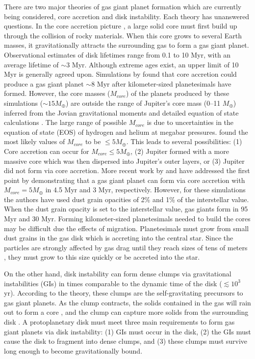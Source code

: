 \documentclass[12pt,preprint2]{aastex}
\begin{document}
There are two major theories of gas giant planet formation which are currently being considered, core accretion and disk
instability. Each theory has unanswered questions. In the core accretion picture \citep{mizuno1980}, a large solid core
must first build up through the collision of rocky materials. When this core grows to several Earth masses, it
gravitationally attracts the surrounding gas to form a gas giant planet. Observational estimates of disk lifetimes range
from 0.1 to 10 Myr, \citep{haisch2001,chen2004} with an average lifetime of $\sim 3$ Myr. Although extreme ages exist,
an upper limit of 10 Myr is generally agreed upon. Simulations by \citet{pollack1996} found that core accretion could
produce a gas giant planet $\sim 8$ Myr after kilometer-sized planetesimals have formed. However, the core masses
($M_{core}$) of the planets produced by these simulations ($\sim 15 M_{\oplus}$) are outside the range of Jupiter's core
mass (0--11 $M_{\oplus}$) inferred from the Jovian gravitational moments and detailed equation of state calculations
\citep{saumon2004}. The large range of possible $M_{core}$ is due to uncertainties in the equation of state (EOS) of
hydrogen and helium at megabar pressures. \citet{saumon2004} found the most likely values of $M_{core}$ to be $\leq 5
M_{\oplus}$. This leads to several possibilities: (1) Core accretion can occur for $M_{core} \leq 5 M_{\oplus}$, (2)
Jupiter formed with a more massive core which was then dispersed into Jupiter's outer layers, or (3) Jupiter did not
form via core accretion. More recent work by \citet{hub2005} and \citet{papa2005} have addressed the first point by
demonstrating that a gas giant planet can form via core accretion with $M_{core}=5 M_{\oplus}$ in 4.5 Myr and 3 Myr,
respectively. However, for these simulations the authors have used dust grain opacities of 2\% and 1\% of the
interstellar value. When the dust grain opacity is set to the interstellar value, gas giants form in 95 Myr and 30
Myr. Forming kilometer-sized planetesimals needed to build the cores may be difficult due the effects of
migration. Planetesimals must grow from small dust grains in the gas disk which is accreting into the central
star. Since the particles are strongly affected by gas drag until they reach sizes of tens of meters \citep{weiden1977},
they must grow to this size quickly or be accreted into the star.

On the other hand, disk instability \citep{kup1951,cam1978,boss1997} can form dense clumps via gravitational
instabilities (GIs) in times comparable to the dynamic time of the disk ($\lesssim 10^3$ yr). According to the theory,
these clumps are the self-gravitating precursors to gas giant planets. As the clump contracts, the solids contained in
the gas will rain out to form a core \citep{slattery1980}, and the clump can capture more solids from the surrounding
disk \citep{helled2006}. A protoplanetary disk must meet three main requirements to form gas giant planets via disk
instability: (1) GIs must occur in the disk, (2) the GIs must cause the disk to fragment into dense clumps, and (3)
these clumps must survive long enough to become gravitationally bound.
\end{document}
